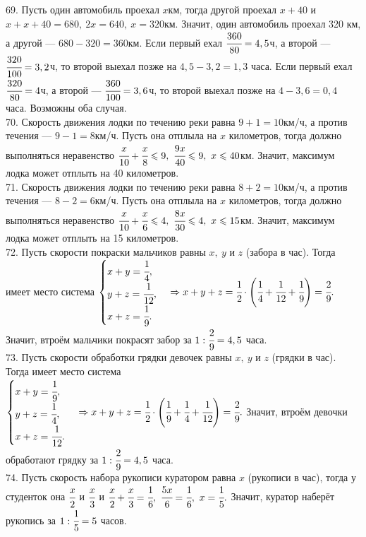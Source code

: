 \documentclass[12pt]{article}
\begin{document}
69. Пусть один автомобиль проехал $x$км, тогда другой проехал $x+40$ и $x+x+40=680,\ 2x=640,\ x=320$км. Значит, один автомобиль проехал 320 км, а другой --- $680-320=360$км. Если первый ехал $\cfrac{360}{80}=4,5$ч, а второй --- $\cfrac{320}{100}=3,2$ч, то второй выехал позже на $4,5-3,2=1,3$ часа. Если первый ехал $\cfrac{320}{80}=4$ч, а второй --- $\cfrac{360}{100}=3,6$ч, то второй выехал позже на $4-3,6=0,4$ часа. Возможны оба случая.\\
70. Скорость движения лодки по течению реки равна $9+1=10$км/ч, а против течения --- $9-1=8$км/ч. Пусть она отплыла на $x$ километров, тогда должно выполняться неравенство $\cfrac{x}{10}+\cfrac{x}{8}\leqslant9,\ \cfrac{9x}{40}\leqslant9,\ x\leqslant40$км. Значит, максимум лодка может отплыть на 40 километров.\\
71. Скорость движения лодки по течению реки равна $8+2=10$км/ч, а против течения --- $8-2=6$км/ч. Пусть она отплыла на $x$ километров, тогда должно выполняться неравенство $\cfrac{x}{10}+\cfrac{x}{6}\leqslant4,\ \cfrac{8x}{30}\leqslant4,\ x\leqslant15$км. Значит, максимум лодка может отплыть на 15 километров.\\
72. Пусть скорости покраски мальчиков равны $x,\ y$ и $z$ (забора в час). Тогда имеет место система $\begin{cases} x+y=\cfrac{1}{4},\\ y+z=\cfrac{1}{12},\\ x+z=\cfrac{1}{9}.\end{cases}\Rightarrow x+y+z=\cfrac{1}{2}\cdot\left(\cfrac{1}{4}+\cfrac{1}{12}+\cfrac{1}{9}\right)=\cfrac{2}{9}.$ Значит, втроём мальчики покрасят забор за $1:\cfrac{2}{9}=4,5$ часа.\\
73. Пусть скорости обработки грядки девочек равны $x,\ y$ и $z$ (грядки в час). Тогда имеет место система $\begin{cases} x+y=\cfrac{1}{9},\\ y+z=\cfrac{1}{4},\\ x+z=\cfrac{1}{12}.\end{cases}\Rightarrow x+y+z=\cfrac{1}{2}\cdot\left(\cfrac{1}{9}+\cfrac{1}{4}+\cfrac{1}{12}\right)=\cfrac{2}{9}.$ Значит, втроём девочки обработают грядку за $1:\cfrac{2}{9}=4,5$ часа.\\
74. Пусть скорость набора рукописи куратором равна $x$ (рукописи в час), тогда у студенток она $\cfrac{x}{2}$ и $\cfrac{x}{3}$ и $\cfrac{x}{2}+\cfrac{x}{3}=\cfrac{1}{6},\ \cfrac{5x}{6}=\cfrac{1}{6},\ x=\cfrac{1}{5}.$ Значит, куратор наберёт рукопись за $1:\cfrac{1}{5}=5$ часов.\\
\end{document}
